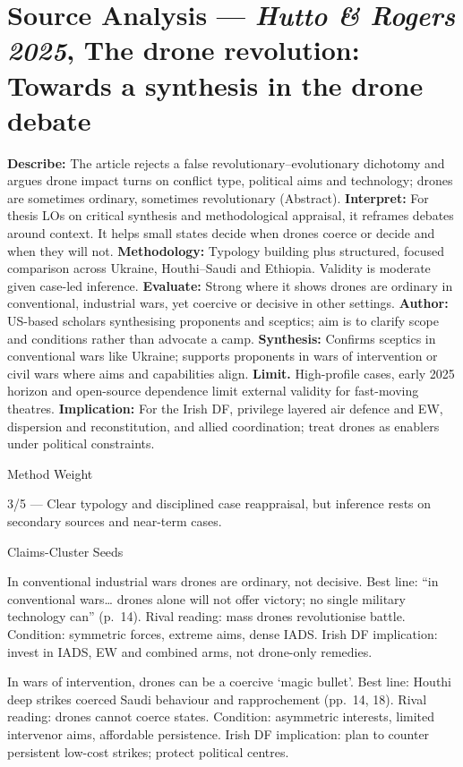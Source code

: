 \section*{Source Analysis — \textit{Hutto & Rogers 2025}, The drone revolution: Towards a synthesis in the drone debate}
\textbf{Describe:} The article rejects a false revolutionary–evolutionary dichotomy and argues drone impact turns on conflict type, political aims and technology; drones are sometimes ordinary, sometimes revolutionary (Abstract).
\textbf{Interpret:} For thesis LOs on critical synthesis and methodological appraisal, it reframes debates around context. It helps small states decide when drones coerce or decide and when they will not.
\textbf{Methodology:} Typology building plus structured, focused comparison across Ukraine, Houthi–Saudi and Ethiopia. Validity is moderate given case-led inference.
\textbf{Evaluate:} Strong where it shows drones are ordinary in conventional, industrial wars, yet coercive or decisive in other settings.
\textbf{Author:} US-based scholars synthesising proponents and sceptics; aim is to clarify scope and conditions rather than advocate a camp.
\textbf{Synthesis:} Confirms sceptics in conventional wars like Ukraine; supports proponents in wars of intervention or civil wars where aims and capabilities align.
\textbf{Limit.} High-profile cases, early 2025 horizon and open-source dependence limit external validity for fast-moving theatres.
\textbf{Implication:} For the Irish DF, privilege layered air defence and EW, dispersion and reconstitution, and allied coordination; treat drones as enablers under political constraints.

Method Weight

3/5 — Clear typology and disciplined case reappraisal, but inference rests on secondary sources and near-term cases.

Claims-Cluster Seeds

In conventional industrial wars drones are ordinary, not decisive.
Best line: “in conventional wars… drones alone will not offer victory; no single military technology can” (p.~14).
Rival reading: mass drones revolutionise battle.
Condition: symmetric forces, extreme aims, dense IADS.
Irish DF implication: invest in IADS, EW and combined arms, not drone-only remedies.

In wars of intervention, drones can be a coercive ‘magic bullet’.
Best line: Houthi deep strikes coerced Saudi behaviour and rapprochement (pp.~14, 18).
Rival reading: drones cannot coerce states.
Condition: asymmetric interests, limited intervenor aims, affordable persistence.
Irish DF implication: plan to counter persistent low-cost strikes; protect political centres.


